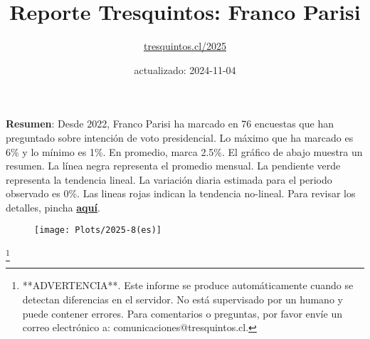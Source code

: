 \documentclass[
]{article}
\title{Reporte Tresquintos: Franco Parisi}
\subtitle{\href{https://tresquintos.cl}{tresquintos.cl/2025}}
\author{}
\date{\vspace{-2.5em}actualizado: 2024-11-04}
\begin{document}
\maketitle

\addtolength{\headheight}{1.0cm} 
\pagestyle{fancy} 
\renewcommand{\headrulewidth}{0pt}

\textbf{Resumen}: Desde 2022, Franco Parisi ha marcado en 76 encuestas
que han preguntado sobre intención de voto presidencial. Lo máximo que
ha marcado es 6\% y lo mínimo es 1\%. En promedio, marca 2.5\%. El
gráfico de abajo muestra un resumen. La línea negra representa el
promedio mensual. La pendiente verde representa la tendencia lineal. La
variación diaria estimada para el periodo observado es 0\%. Las lineas
rojas indican la tendencia no-lineal. Para revisar los detalles, pincha
\href{https://tresquintos.cl/2025}{\textbf{aquí}}.

\begin{figure}

{\centering \texttt{[image: Plots/2025-8(es)]} 

}

\end{figure}

\let\thefootnote\relax

\footnote{**ADVERTENCIA**. Este informe se produce automáticamente cuando se detectan diferencias en el servidor. No está supervisado por un humano y puede contener errores. Para comentarios o preguntas, por favor envíe un correo electrónico a: comunicaciones@tresquintos.cl.}
\end{document}

